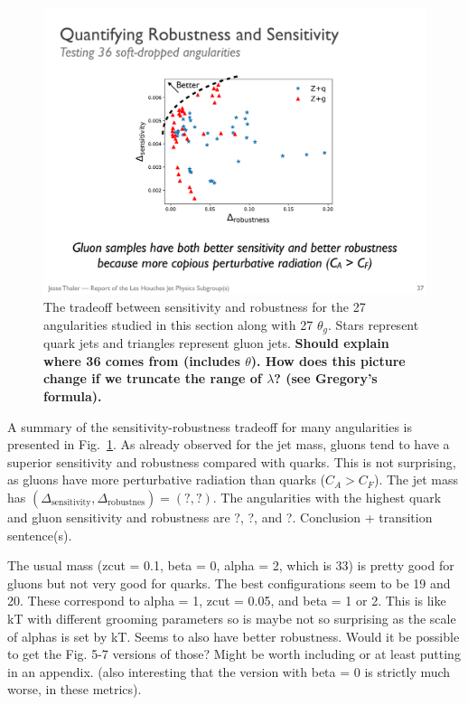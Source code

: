 \begin{figure}[h!]
\begin{center}
\includegraphics[width = 0.6\columnwidth]{figures/robseptradeoff.pdf}
\end{center}
\caption{The tradeoff between sensitivity and robustness for the 27 angularities studied in this section along with 27 $\theta_g$.  Stars represent quark jets and triangles represent gluon jets. \textbf{Should explain where 36 comes from (includes $\theta$).  How does this picture change if we truncate the range of $\lambda$?  (see Gregory's formula).}}
\label{fig:robseptradeoff}
\end{figure}

A summary of the sensitivity-robustness tradeoff for many angularities is presented in Fig.~\ref{fig:robseptradeoff}.  As already observed for the jet mass, gluons tend to have a superior sensitivity and robustness compared with quarks.  This is not surprising, as gluons have more perturbative radiation than quarks ($C_A>C_F$).  The jet mass has $(\Delta_\text{sensitivity},\Delta_\text{robustnes})=(?,?)$.  The angularities with the highest quark and gluon sensitivity and robustness are ?, ?, and ?.   Conclusion + transition sentence(s).

The usual mass (zcut = 0.1, beta = 0, alpha = 2, which is 33) is pretty good for gluons but not very good for quarks.  The best configurations seem to be 19 and 20.  These correspond to alpha = 1, zcut = 0.05, and beta = 1 or 2.  This is like kT with different grooming parameters so is maybe not so surprising as the scale of alphas is set by kT.  Seems to also have better robustness.  Would it be possible to get the Fig. 5-7 versions of those?  Might be worth including or at least putting in an appendix.  (also interesting that the version with beta = 0 is strictly much worse, in these metrics).









